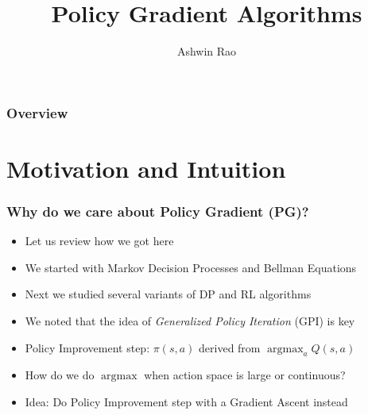 \documentclass[handout]{beamer}
\title[Policy Gradient Algorithms]{Policy Gradient Algorithms} %
\author{Ashwin Rao} %
\institute[Stanford] %
{ICME, Stanford University
}
\date{} %
\DeclareMathOperator*{\argmax}{argmax}
\begin{document}
\begin{frame}
\titlepage %
\end{frame}

\begin{frame}
\frametitle{Overview} %
\tableofcontents %
\end{frame}

\section{Motivation and Intuition}


\begin{frame}
\frametitle{Why do we care about Policy Gradient (PG)?}
\pause
\begin{itemize}[<+->]
\item Let us review how we got here
\item We started with Markov Decision Processes and Bellman Equations
\item Next we studied several variants of DP and RL algorithms
\item We noted that the idea of {\em Generalized Policy Iteration} (GPI) is key
\item Policy Improvement step: $\pi(s, a)$ derived from $\argmax_a Q(s, a)$
\item How do we do $\argmax$ when action space is large or continuous?
\item Idea: Do Policy Improvement step with a Gradient Ascent instead
\end{itemize}
\end{frame}
\end{document}
